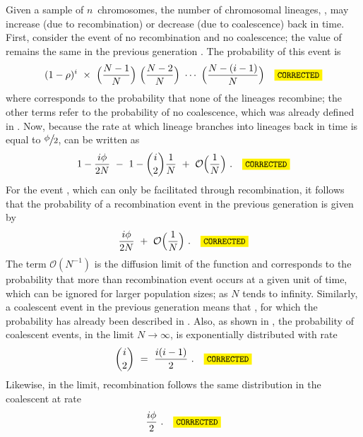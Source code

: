 Given a sample of $n$~chromosomes, the number of chromosomal lineages, , may increase (due to recombination) or decrease (due to coalescence) back in time.
First, consider the event of no recombination and no coalescence; \ie the value of  remains the same in the previous generation \citep[\eg, see][]{tavare2004}.
The probability of this event is
\begin{equation}\label{eq:coalrec_dont1}
	(1-\rho)^i~\times~\Big(\frac{N-1}{N} \Big)~\Big(\frac{N-2}{N}\Big)~\cdots~\Big(\frac{N-(i-1)}{N}\Big) \CorrectLabel
\end{equation}
where  corresponds to the probability that none of the lineages recombine; the other terms refer to the probability of no coalescence, which was already defined in .
Now, because the rate at which  lineage branches into  lineages back in time is equal to $\large \sfrac{\phi}{2}$,  can be written as
\begin{equation}\label{eq:coalrec_dont2}
	1-\frac{i\phi}{2N}~-~1-{i \choose 2}\frac{1}{N}~+~\mathcal{O}\Big(\frac{1}{N}\Big)
	\ \text{.} \CorrectLabel
\end{equation}
For the event , which can only be facilitated through recombination, it follows that the probability of a recombination event in the previous generation is given by
\begin{equation}
	\frac{i\phi}{2N}~+~\mathcal{O}\Big(\frac{1}{N}\Big)
	\ \text{.} \CorrectLabel
\end{equation}
The term ${\mathcal{O}(N^{-1})}$ is the diffusion limit of the function and corresponds to the probability that more than  recombination event occurs at a given unit of time, which can be ignored for larger population sizes; \ie as $N$ tends to infinity.
Similarly, a coalescent event in the previous generation means that , for which the probability has already been described in .
Also, as shown in , the probability of coalescent events, in the limit ${N\rightarrow\infty}$, is exponentially distributed with rate
\begin{equation}
	{i\choose 2}~=~\frac{i(i-1)}{2}
	\ \text{.} \CorrectLabel
\end{equation}
Likewise, in the limit, recombination follows the same distribution in the coalescent at rate
\begin{equation}
	\frac{i\phi}{2}
	\ \text{.} \CorrectLabel
\end{equation}

